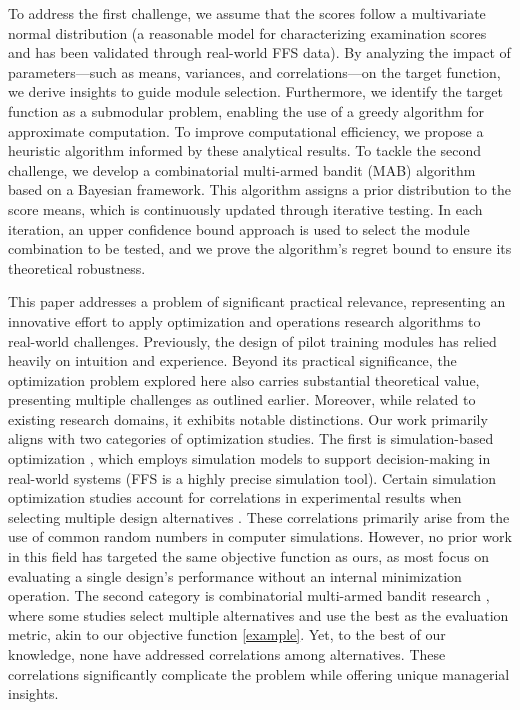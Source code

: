 \documentclass[opre,sglanonrev]{informs4}
\begin{document}
To address the first challenge, we assume that the scores follow a multivariate normal distribution (a reasonable model for characterizing examination scores \citep{Ross2014} and has been validated through real-world FFS data). By analyzing the impact of parameters—such as means, variances, and correlations—on the target function, we derive insights to guide module selection. Furthermore, we identify the target function as a submodular problem, enabling the use of a greedy algorithm for approximate computation. To improve computational efficiency, we propose a heuristic algorithm informed by these analytical results. To tackle the second challenge, we develop a combinatorial multi-armed bandit (MAB) algorithm based on a Bayesian framework. This algorithm assigns a prior distribution to the score means, which is continuously updated through iterative testing. In each iteration, an upper confidence bound approach is used to select the module combination to be tested, and we prove the algorithm’s regret bound to ensure its theoretical robustness.

This paper addresses a problem of significant practical relevance, representing an innovative effort to apply optimization and operations research algorithms to real-world challenges. Previously, the design of pilot training modules has relied heavily on intuition and experience. Beyond its practical significance, the optimization problem explored here also carries substantial theoretical value, presenting multiple challenges as outlined earlier. Moreover, while related to existing research domains, it exhibits notable distinctions. Our work primarily aligns with two categories of optimization studies. The first is simulation-based optimization \citep{Fu2015}, which employs simulation models to support decision-making in real-world systems (FFS is a highly precise simulation tool). Certain simulation optimization studies account for correlations in experimental results when selecting multiple design alternatives \citep{xie2016bayesian}. These correlations primarily arise from the use of common random numbers in computer simulations. However, no prior work in this field has targeted the same objective function as ours, as most focus on evaluating a single design’s performance without an internal minimization operation. The second category is combinatorial multi-armed bandit research \citep{Chen2013}, where some studies select multiple alternatives and use the best as the evaluation metric, akin to our objective function \eqref{example}. Yet, to the best of our knowledge, none have addressed correlations among alternatives. These correlations significantly complicate the problem while offering unique managerial insights.
\end{document}
